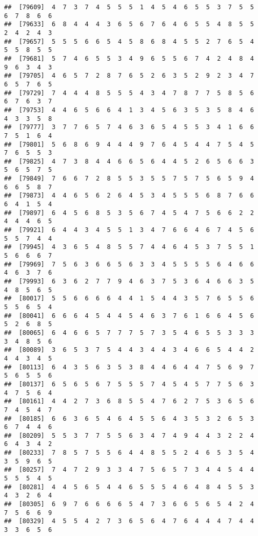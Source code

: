 \documentclass[
]{book}
\begin{document}
\begin{verbatim}
##  [79609]  4  7  3  7  4  5  5  5  1  4  5  4  6  5  5  3  7  5  5  6  7  8  6  6
##  [79633]  6  8  4  4  4  3  6  5  6  7  6  4  6  5  5  4  8  5  5  2  4  2  4  3
##  [79657]  5  5  5  6  6  5  4  5  8  6  8  4  5  5  2  7  6  5  4  5  5  8  5  5
##  [79681]  5  7  4  6  5  5  3  4  9  6  5  5  6  7  4  2  4  8  4  9  6  3  4  3
##  [79705]  4  6  5  7  2  8  7  6  5  2  6  3  5  2  9  2  3  4  7  6  5  7  6  5
##  [79729]  7  4  4  4  8  5  5  5  4  3  4  7  8  7  7  5  8  5  6  6  7  6  3  7
##  [79753]  4  4  6  5  6  6  4  1  3  4  5  6  3  5  3  5  8  4  6  4  3  3  5  8
##  [79777]  3  7  7  6  5  7  4  6  3  6  5  4  5  5  3  4  1  6  6  7  5  1  6  4
##  [79801]  5  6  8  6  9  4  4  4  9  7  6  4  5  4  4  7  5  4  5  7  6  5  5  3
##  [79825]  4  7  3  8  4  4  6  6  5  6  4  4  5  2  6  5  6  6  3  5  6  5  7  5
##  [79849]  7  6  6  7  2  8  5  5  3  5  5  7  5  7  5  6  5  9  4  6  6  5  8  7
##  [79873]  4  4  6  5  6  2  6  4  5  3  4  5  5  5  6  8  7  6  6  6  4  1  5  4
##  [79897]  6  4  5  6  8  5  3  5  6  7  4  5  4  7  5  6  6  2  2  4  4  4  6  5
##  [79921]  6  4  4  3  4  5  5  1  3  4  7  6  6  4  6  7  4  5  6  5  5  7  4  4
##  [79945]  4  3  6  5  4  8  5  5  7  4  4  6  4  5  3  7  5  5  1  5  6  6  6  7
##  [79969]  7  5  6  3  6  6  5  6  3  3  4  5  5  5  5  6  4  6  6  4  6  3  7  6
##  [79993]  6  3  6  2  7  7  9  4  6  3  7  5  3  6  4  6  6  3  5  4  8  5  6  5
##  [80017]  5  5  6  6  6  6  4  4  1  5  4  4  3  5  7  6  5  5  6  5  5  6  5  4
##  [80041]  6  6  6  4  5  4  4  5  4  6  3  7  6  1  6  6  4  5  6  5  2  6  8  5
##  [80065]  6  4  6  6  5  7  7  7  5  7  3  5  4  6  5  5  3  3  3  3  4  8  5  6
##  [80089]  3  6  5  3  7  5  4  4  3  4  4  3  4  6  6  5  4  4  2  4  4  3  4  5
##  [80113]  6  4  3  5  6  3  5  3  8  4  4  6  4  4  7  5  6  9  7  5  6  5  5  6
##  [80137]  6  5  6  5  6  7  5  5  5  7  4  5  4  5  7  7  5  6  3  4  7  5  6  4
##  [80161]  4  4  2  7  3  6  8  5  5  4  7  6  2  7  5  3  6  5  6  7  4  5  4  7
##  [80185]  6  6  3  6  5  4  6  4  5  5  6  4  3  5  3  2  6  5  3  6  7  4  4  6
##  [80209]  5  5  3  7  7  5  5  6  3  4  7  4  9  4  4  3  2  2  4  6  4  3  4  2
##  [80233]  7  8  5  7  5  5  6  4  4  8  5  5  2  4  6  5  3  5  4  3  5  9  6  5
##  [80257]  7  4  7  2  9  3  3  4  7  5  6  5  7  3  4  4  5  4  4  5  5  5  4  5
##  [80281]  4  4  5  6  5  4  4  6  5  5  5  4  6  4  8  4  5  5  3  4  3  2  6  4
##  [80305]  6  9  7  6  6  6  6  5  4  7  3  6  6  5  6  5  4  2  4  7  5  6  6  9
##  [80329]  4  5  5  4  2  7  3  6  5  6  4  7  6  4  4  4  7  4  4  3  3  6  5  6

\end{verbatim}
\end{document}
